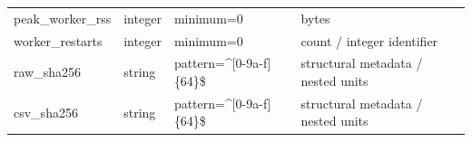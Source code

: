\begin{table}[htbp]
\begin{tabularx}{\textwidth}{@{}>{\raggedright\arraybackslash}p{}>{\raggedright\arraybackslash}p{}>{\raggedright\arraybackslash}X>{\raggedright\arraybackslash}X@{}}
peak\_\allowbreak{}worker\_\allowbreak{}rss & integer & minimum=\allowbreak{}0 & bytes\\
worker\_\allowbreak{}restarts & integer & minimum=\allowbreak{}0 & count /\allowbreak{} integer identifier\\
raw\_\allowbreak{}sha256 & string & pattern=\allowbreak{}\textasciicircum{}[0-9a-\allowbreak{}f]\{64\}\$ & structural metadata /\allowbreak{} nested units\\
csv\_\allowbreak{}sha256 & string & pattern=\allowbreak{}\textasciicircum{}[0-9a-\allowbreak{}f]\{64\}\$ & structural metadata /\allowbreak{} nested units\\
\bottomrule\end{tabularx}
\end{table}
